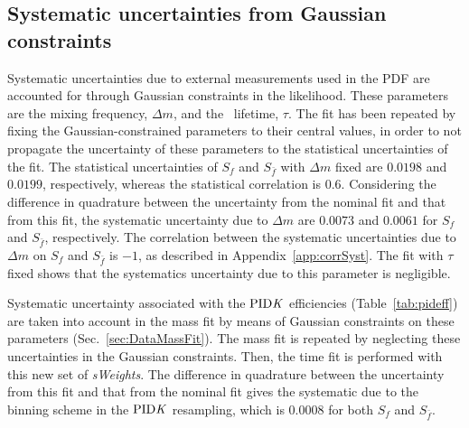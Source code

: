 \subsection{Systematic uncertainties from Gaussian constraints}
\label{sec:systFromConsts}
Systematic uncertainties due to external measurements used in the PDF
are accounted for through Gaussian constraints in the likelihood. These parameters are
the mixing frequency, $\Delta m$, and the \Bz~lifetime, $\tau$.
The fit has been repeated by fixing the Gaussian-constrained parameters to their central values,
in order to not propagate the uncertainty of these parameters to the statistical uncertainties of the fit.
The statistical uncertainties of $S_{f}$ and $S_{\bar f}$ with $\Delta m$ fixed are $0.0198$ and $0.0199$, respectively, whereas the statistical correlation is $0.6$.
Considering the difference in quadrature between the uncertainty from the nominal fit and that from this fit,
the systematic uncertainty due to $\Delta m$ are $0.0073$ and $0.0061$ for $S_{f}$ and $S_{\bar f}$, respectively.
The correlation between the systematic uncertainties due to $\Delta m$ on $S_{f}$ and $S_{\bar f}$ is $-1$, as described in Appendix~\ref{app:corrSyst}.
The fit with $\tau$ fixed shows that the systematics uncertainty due to this parameter is negligible.

Systematic uncertainty associated with the $\rm{PID}\it{K}$ efficiencies (Table~\ref{tab:pideff})
are taken into account
in the mass fit by means of Gaussian constraints on these parameters (Sec.~\ref{sec:DataMassFit}).  The mass fit is repeated by neglecting these uncertainties in the Gaussian constraints.
Then, the time fit is performed with this new set of \emph{sWeights}. The difference
in quadrature between the uncertainty from this fit and that from the nominal fit gives the systematic due to the binning scheme in the
$\rm{PID}\it{K}$ resampling, which is $0.0008$ for both $S_{f}$ and $S_{\bar f}$.


